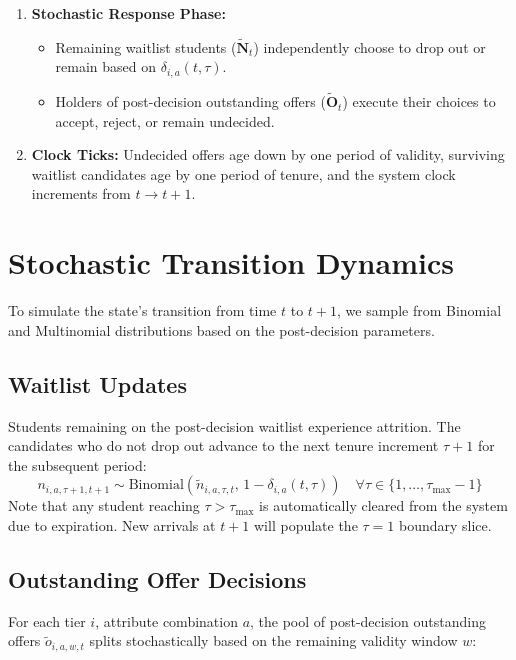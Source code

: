 \documentclass{article}
\newcommand{\Binomial}{\mathrm{Binomial}}
\begin{document}
\begin{enumerate}
    \item \textbf{Stochastic Response Phase:} 
    \begin{itemize}
        \item Remaining waitlist students ($\tilde{\mathbf{N}}_t$) independently choose to drop out or remain based on $\delta_{i, a}(t, \tau)$.
        \item Holders of post-decision outstanding offers ($\tilde{\mathbf{O}}_t$) execute their choices to accept, reject, or remain undecided.
    \end{itemize}

    \item \textbf{Clock Ticks:} Undecided offers age down by one period of validity, surviving waitlist candidates age by one period of tenure, and the system clock increments from $t \to t + 1$.
\end{enumerate}

\section{Stochastic Transition Dynamics}

To simulate the state's transition from time $t$ to $t + 1$, we sample from Binomial and Multinomial distributions based on the post-decision parameters.

\subsection{Waitlist Updates}
Students remaining on the post-decision waitlist experience attrition. The candidates who do not drop out advance to the next tenure increment $\tau + 1$ for the subsequent period:
\[
n_{i, a, \tau+1, t+1} \sim \Binomial(\tilde{n}_{i, a, \tau, t}, \, 1 - \delta_{i, a}(t, \tau)) \quad \forall \tau \in \{1, \dots, \tau_{\max}-1\}
\]
Note that any student reaching $\tau > \tau_{\max}$ is automatically cleared from the system due to expiration. New arrivals at $t+1$ will populate the $\tau = 1$ boundary slice.

\subsection{Outstanding Offer Decisions}
For each tier $i$, attribute combination $a$, the pool of post-decision outstanding offers $\tilde{o}_{i, a, w, t}$ splits stochastically based on the remaining validity window $w$:
\end{document}
